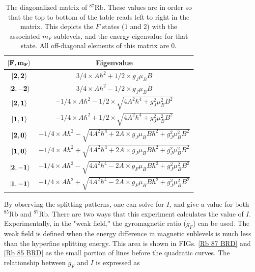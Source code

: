 \documentclass[
 reprint,
linenumbers,
aps,amsmath
]{revtex4-2}
\begin{document}
\begin{table} [h]
\begin{tabular}{|c|c|}
\hline
$\mathbf{\ket{F, m_F}}$ & \textbf{Eigenvalue} \\ 
\hline \hline
$\mathbf{\ket{2,2}}$ & $3/4 \times A\hbar^2 + 1/2 \times g_J\mu_BB$ \\ \hline
$\mathbf{\ket{2,-2}}$ & $3/4 \times A\hbar^2 - 1/2 \times g_J\mu_BB$ \\ \hline
$\mathbf{\ket{2,1}}$ & $-1/4 \times A\hbar^2 - 1/2 \times \sqrt{4A^2\hbar^4 + g_J^2\mu_B^2B^2}$\\ \hline
$\mathbf{\ket{1,1}}$ & $-1/4 \times A\hbar^2 + 1/2 \times \sqrt{4A^2\hbar^4 + g_J^2\mu_B^2B^2}$\\ \hline
$\mathbf{\ket{2, 0}}$ & $-1/4 \times A\hbar^2 - \sqrt{4A^2\hbar^4 + 2A \times g_J\mu_BB\hbar^2 + g_J^2\mu_B^2B^2}$\\ \hline
$\mathbf{\ket{1,0}}$ & $-1/4 \times A\hbar^2 + \sqrt{4A^2\hbar^4 + 2A \times g_J\mu_BB\hbar^2 + g_J^2\mu_B^2B^2}$\\ \hline
$\mathbf{\ket{2,-1}}$ & $-1/4 \times A\hbar^2 - \sqrt{4A^2\hbar^4 - 2A \times g_F\mu_BB\hbar^2 + g_J^2\mu_B^2B^2}$ \\ \hline
$\mathbf{\ket{1,-1}}$ & $-1/4 \times A\hbar^2 + \sqrt{4A^2\hbar^4 - 2A \times g_F\mu_BB\hbar^2 + g_J^2\mu_B^2B^2}$\\ \hline
\end{tabular}
\caption{The diagonalized matrix of $^{87}\mathrm{Rb}$. These values are in order so that the top to bottom of the table reads left to right in the matrix. This depicts the $F$ states ($1$ and $2$) with the associated $m_F$ sublevels, and the energy eigenvalue for that state. All off-diagonal elements of this matrix are $0$.}
\label{Diag of Rb87}
\end{table}

By observing the splitting patterns, one can solve for $I$, and give a value for both $^{85}\mathrm{Rb}$ and $^{87}\mathrm{Rb}$. There are two ways that this experiment calculates the value of $I$. Experimentally, in the "weak field," the gyromagnetic ratio ($g_F$) can be used. The weak field is defined when the energy difference in magnetic sublevels is much less than the hyperfine splitting energy. This area is shown in FIGs. \ref{Rb 87 BRD} and \ref{Rb 85 BRD} as the small portion of lines before the quadratic curves. The relationship between $g_F$ and $I$ is expressed as
\end{document}

